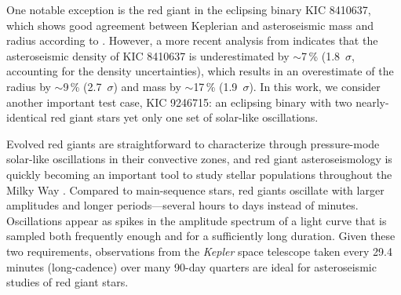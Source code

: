 
One notable exception is the red giant in the eclipsing binary KIC 8410637, which shows good agreement between Keplerian and asteroseismic mass and radius according to \citet{fra13}. However, a more recent analysis from \citet{hub14} indicates that the asteroseismic density of KIC 8410637 is underestimated by $\sim$7\,\% (1.8~$\sigma$, accounting for the density uncertainties), which results in an overestimate of the radius by $\sim$9\,\% (2.7~$\sigma$) and mass by $\sim$17\,\% (1.9~$\sigma$). In this work, we consider another important test case, KIC 9246715: an eclipsing binary with two nearly-identical red giant stars yet only one set of solar-like oscillations.

Evolved red giants are straightforward to characterize through pressure-mode solar-like oscillations in their convective zones, and red giant asteroseismology is quickly becoming an important tool to study stellar populations throughout the Milky Way \citep[for a review of this topic, see][]{cha13}. Compared to main-sequence stars, red giants oscillate with larger amplitudes and longer periods---several hours to days instead of minutes. Oscillations appear as spikes in the amplitude spectrum of a light curve that is sampled both frequently enough and for a sufficiently long duration. Given these two requirements, observations from the \emph{Kepler} space telescope taken every 29.4 minutes (long-cadence) over many 90-day quarters are ideal for asteroseismic studies of red giant stars.


